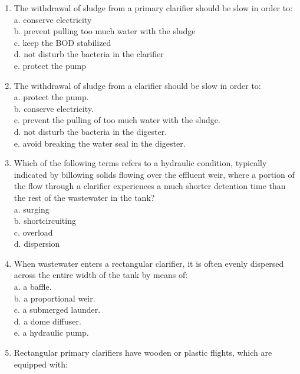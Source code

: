 \begin{tcolorbox}[breakable, enhanced,
colframe=blue!25,
colback=blue!10,
coltitle=blue!20!black,  
title= Chapter Assessment]
\begin{enumerate}
\item  The withdrawal of sludge from a primary clarifier should be slow in order to: \\

a. conserve electricity \\
b. prevent pulling too much water with the sludge \\
c. keep the BOD stabilized \\
d. not disturb the bacteria in the clarifier \\
e. protect the pump \\


\item  The withdrawal of sludge from a clarifier should be slow in order to: \\

a. protect the pump. \\
b. conserve electricity. \\
c. prevent the pulling of too much water with the sludge. \\
d. not disturb the bacteria in the digester. \\
e. avoid breaking the water seal in the digester. \\


\item  Which of the following terms refers to a hydraulic condition, typically indicated by billowing solids flowing over the effluent weir, where a portion of the flow through a clarifier experiences a much shorter detention time than the rest of the wastewater in the tank? \\

a. surging \\
b. shortcircuiting \\
c. overload \\
d. dispersion \\


\item  When wastewater enters a rectangular clarifier, it is often evenly dispersed across the entire width of the tank by means of: \\

a. a baffle. \\
b. a proportional weir. \\
c. a submerged launder. \\
d. a dome diffuser. \\
e. a hydraulic pump. \\


\item  Rectangular primary clarifiers have wooden or plastic flights, which are equipped with: \\


\end{enumerate}
\end{tcolorbox}
